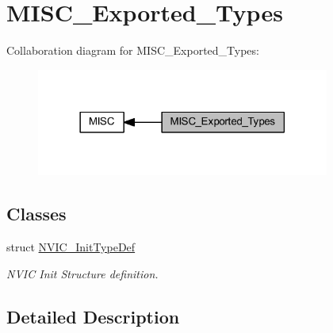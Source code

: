 \hypertarget{group___m_i_s_c___exported___types}{}\section{M\+I\+S\+C\+\_\+\+Exported\+\_\+\+Types}
\label{group___m_i_s_c___exported___types}
Collaboration diagram for M\+I\+S\+C\+\_\+\+Exported\+\_\+\+Types\+:
\nopagebreak
\begin{figure}[H]
\begin{center}
\leavevmode
\includegraphics[width=273pt]{group___m_i_s_c___exported___types}
\end{center}
\end{figure}
\subsection*{Classes}
\begin{DoxyCompactItemize}
\item 
struct \hyperlink{struct_n_v_i_c___init_type_def}{N\+V\+I\+C\+\_\+\+Init\+Type\+Def}
\begin{DoxyCompactList}\small\item\em N\+V\+IC Init Structure definition. \end{DoxyCompactList}\end{DoxyCompactItemize}


\subsection{Detailed Description}
